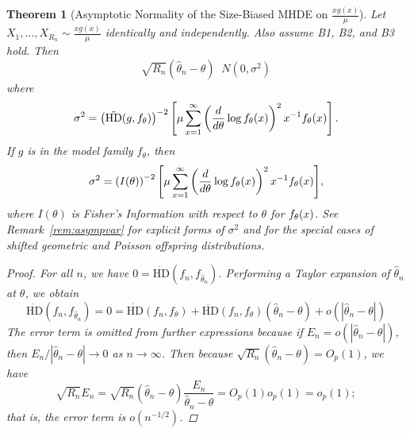 \documentclass[11 pt]{article}
\newtheorem{thm}{Theorem}
\renewcommand{\th}{\theta}
\newcommand{\xra}[1]{\mathop{ \xrightarrow{#1} }}
\newcommand{\fb}[1]{ \mathop{ \left[ #1 \right] } }
\newcommand{\hell}{\text{HD}}
\newcommand{\dhell}{\dot{\hell}}
\newcommand{\ddhell}{\ddot{\hell}}
\newcommand{\gs}{\frac{xg(x)}{\mu}}
\newcommand{\mhde}{\hat{\th}_n}
\newcommand{\fthnx}{f_{\th}}
\begin{document}
\begin{thm}[Asymptotic Normality of the Size-Biased MHDE on $\gs$]
Let $X_1,...,X_{R_n} \sim \gs$ identically and independently. Also assume B1, B2, and B3 hold. Then
\[
\sqrt{R_n}(\mhde - \th) \xra{\mathcal{L}} N(0, \sigma^2)
\]
where
\[
\sigma^2 = \left( \ddhell(g,\fthnx) \right )^{-2} \fb{\mu \sum_{x=1}^{\infty} \left ( \frac{d}{d \th} \log \fth \right )^2 x^{-1} \fth}.
\]
If $g$ is in the model family $\fthnx$, then
\[
\sigma^2 = \left( I(\th)  \right)^{-2} \fb{\mu \sum_{x=1}^{\infty} \left (\frac{d}{d \th} \log \fth \right )^2 x^{-1} \fth},
\]
where $I(\th)$ is Fisher's Information with respect to $\th$ for $\fth$. See Remark~\ref{rem:asympvar} for explicit forms of $\sigma^2$ and for the special cases of shifted geometric and Poisson offspring distributions.
\label{thm:anapp}
\begin{proof}
For all $n$, we have $0 = \dhell(f_n,f_{\mhde})$. Performing a Taylor expansion of $\mhde$ at $\th$, we obtain
\begin{equation}
\dhell(f_n,f_{\mhde}) = 0 = \dhell(f_n,f_\th) + \ddhell(f_n,f_{\th}) (\mhde - \th) + o(|\mhde - \th|) \label{eq:taylor}
\end{equation}
The error term is omitted from further expressions because if $E_n = o(|\mhde - \th|)$, then $E_n / |\mhde - \th| \rightarrow 0$ as $n \rightarrow \infty$. Then because $\sqrt{R_n}(\mhde - \th) = O_p(1)$, we have 
\[
\sqrt{R_n}E_n = \sqrt{R_n} (\mhde - \th)\frac{E_n}{\mhde - \th}  = O_p(1)o_p(1) = o_p(1);
\]
that is, the error term is $o(n^{-1/2})$.


\end{proof}
\end{thm}
\end{document}
